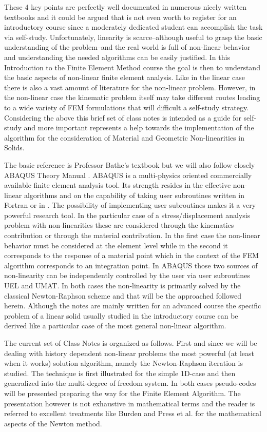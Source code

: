 These 4 key points are perfectly well documented in numerous nicely written textbooks and it could be argued that is not even worth to register for an introductory course since a moderately dedicated student can accomplish the task via self-study. Unfortunately, linearity is scarce--although useful to grasp the basic understanding of the problem--and the real world is full of non-linear behavior and understanding the needed algorithms can be easily justified. In this Introduction to the Finite Element Method course the goal is then to understand the basic aspects of non-linear finite element analysis.  Like in the linear case there is also a vast amount of literature for the non-linear problem.  However, in the non-linear case the kinematic problem itself may take different routes leading to a wide variety of FEM formulations that will difficult a self-study strategy.  Considering the above this brief set of class notes is intended as a guide for self-study and more important represents a help towards the implementation of the algorithm for the consideration of Material and Geometric Non-linearities in Solids.

The basic reference is Professor Bathe's textbook \cite{book:bathe} but we will also follow closely ABAQUS Theory Manual \cite{abaqus_theory}. ABAQUS is a multi-physics oriented commercially available finite element analysis tool. Its strength resides in the effective non-linear algorithms and on the capability of taking user subroutines written in Fortran or in \CPP.  The possibility of implementing user subroutines makes it a very powerful research tool.  In the particular case of a stress/displacement analysis problem with non-linearities these are considered through the kinematics contribution or through the material contribution.  In the first case the non-linear behavior must be considered at the element level while in the second it corresponds to the response of a material point which in the context of the FEM algorithm corresponds to an integration point. In ABAQUS those two sources of non-linearity can be independently controlled by the user via user subroutines UEL and UMAT.  In both cases the non-linearity is primarily solved by the classical Newton-Raphson scheme and that will be the approached followed herein.  Although the notes are mainly written for an advanced course the specific problem of a linear solid usually studied in the introductory course can be derived like a particular case of the most general non-linear algorithm.

The current set of Class Notes is organized as follows.  First and since we will be dealing with history dependent non-linear problems the most powerful (at least when it works) solution algorithm, namely the Newton-Raphson iteration is studied.  The technique is first illustrated for the simple 1D-case and then generalized into the multi-degree of freedom system.  In both cases pseudo-codes will be presented preparing the way for the Finite Element Algorithm.  The presentation however is not exhaustive in mathematical terms and the reader is referred to excellent treatments like Burden \cite{book:burden2011} and Press et al. \cite{book:numerical_recipes} for the mathematical aspects of the Newton method.

